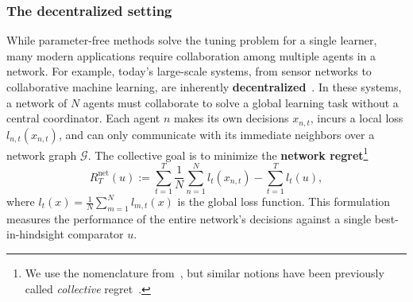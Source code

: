 \documentclass[journal]{IEEEtran}
\begin{document}
\subsubsection*{The decentralized setting}
While parameter-free methods solve the tuning problem for a single learner, many modern applications require collaboration among multiple agents in a network.
For example, today's large-scale systems, from sensor networks to collaborative machine learning, are inherently \textbf{decentralized}~\cite{nedic_rate_2007,johansson_simple_2007}.
In these systems, a network of $N$ agents must collaborate to solve a global learning task without a central coordinator.
Each agent $n$ makes its own decisions $x_{n,t}$, incurs a local loss $l_{n,t}(x_{n,t})$, and can only communicate with its immediate neighbors over a network graph $\mathcal{G}$.
The collective goal is to minimize the \textbf{network regret}\footnote{We use the nomenclature from~\cite{achddou_distributed_2024}, but similar notions have been previously called \emph{collective} regret~\cite{hsieh_multi-agent_2022}.}
\begin{equation}
    R_{T}^{\text{net}}(u) := \sum_{t=1}^{T} \frac{1}{N} \sum_{n=1}^{N} l_{t}(x_{n,t}) - \sum_{t=1}^{T} l_{t}(u), \label{eq:network_regret}
\end{equation}
where $l_t(x) = \frac{1}{N}\sum_{m=1}^{N} l_{m,t}(x)$ is the global loss function.
This formulation measures the performance of the entire network's decisions against a single best-in-hindsight comparator $u$.
\end{document}
